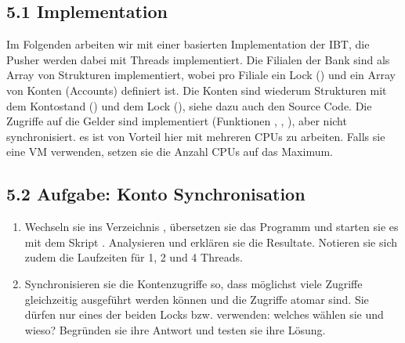 \documentclass[a4paper,10pt,english]{report}
\begin{document}
\subsection{5.1	Implementation}
\label{\detokenize{P08_Sync/README:implementation}}
\sphinxAtStartPar
Im Folgenden arbeiten wir mit einer \sphinxhyphen{}basierten Implementation der IBT, die Pusher werden dabei mit Threads implementiert. Die Filialen der Bank sind als Array von Strukturen implementiert, wobei pro Filiale ein Lock () und ein Array von Konten (Accounts) definiert ist. Die Konten sind wiederum Strukturen mit dem Kontostand () und dem Lock (), siehe dazu auch den Source Code. Die Zugriffe auf die Gelder sind imple\sphinxhyphen{}mentiert (Funktionen , , ), aber nicht synchronisiert.
 es ist von Vorteil hier mit mehreren CPUs zu arbeiten. Falls sie eine VM verwenden, setzen sie die Anzahl CPUs auf das Maximum.


\subsection{5.2	Aufgabe: Konto Synchronisation}
\label{\detokenize{P08_Sync/README:aufgabe-konto-synchronisation}}\begin{enumerate}
%
\item {} 
\sphinxAtStartPar
Wechseln sie ins Verzeichnis , übersetzen sie das Programm und starten sie es mit dem Skript . Analysieren und erklären sie die Resultate. Notie\sphinxhyphen{}ren sie sich zudem die Laufzeiten für 1, 2 und 4 Threads.

\item {} 
\sphinxAtStartPar
Synchronisieren sie die Kontenzugriffe so, dass möglichst viele Zugriffe gleichzeitig ausgeführt werden können und die Zugriffe atomar sind. Sie dürfen nur eines der beiden Locks  bzw.  verwenden: welches wählen sie und wieso? Be\sphinxhyphen{}gründen sie ihre Antwort und testen sie ihre Lösung.

\end{enumerate}
\end{document}
